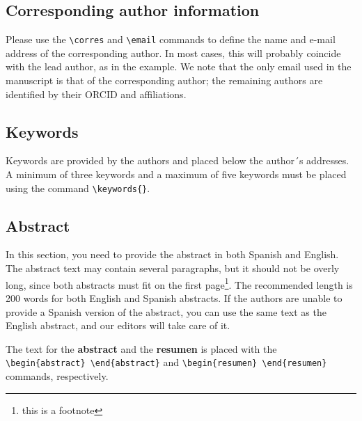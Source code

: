 \documentclass[9pt,article,twoside]{rmaa-rho-class/rmaa-rho}
\newcommand{\CS}[1]{\texttt{\textbackslash #1}}
\begin{document}
    \subsection{Corresponding author information}
    
        Please use the \CS{corres} and \CS{email} commands to define the name and e-mail address of the corresponding author. In most cases, this will probably coincide with the lead author, as in the example. We note that the only email used in the manuscript is that of the corresponding author; the remaining authors are identified by their ORCID and affiliations.

        \subsection{Keywords}

        Keywords are provided by the authors and placed below the author´s addresses. A minimum of three keywords and a maximum of five keywords must be placed using the command \verb|\keywords{}|.
    
    \subsection{Abstract}
    
        In this section, you need to provide the abstract in both Spanish and English. The abstract text may contain several paragraphs, but it should not be overly long, since both abstracts must fit on the first page\footnote{this is a footnote}. The recommended length is 200 words for both English and Spanish abstracts. If the authors are unable to provide a Spanish version of the abstract, you can use the same text as the English abstract, and our editors will take care of it.
    
        The text for the {\bf abstract} and the {\bf resumen} is placed with the \verb|\begin{abstract} \end{abstract}| and \verb|\begin{resumen} \end{resumen}| commands, respectively. 
        
\end{document}
